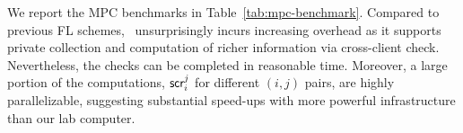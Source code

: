 


We report the MPC benchmarks in Table~\ref{tab:mpc-benchmark}. Compared to previous FL schemes, \ours\ unsurprisingly incurs increasing overhead as it supports private collection and computation of richer information via cross-client check. Nevertheless, the checks can be completed in reasonable time. Moreover, a large portion of the computations, \eg $\score{i}{j}$ for different $(i,j)$ pairs, are highly parallelizable, suggesting substantial speed-ups with more powerful infrastructure than our lab computer.



